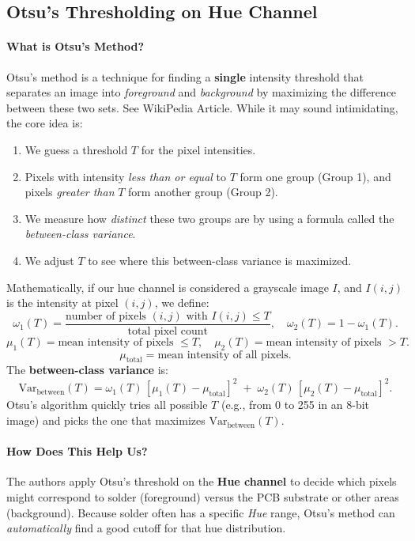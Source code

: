 \documentclass{article}
\begin{document}
\subsection{Otsu’s Thresholding on Hue Channel}
\label{sec:otsu}

\paragraph{What is Otsu’s Method?}
Otsu’s method is a technique for finding a \textbf{single} intensity threshold that separates an image into \emph{foreground} and \emph{background} 
by maximizing the difference between these two sets. See WikiPedia Article.
While it may sound intimidating, the core idea is:

\begin{enumerate}
    \item We guess a threshold $T$ for the pixel intensities.
    \item Pixels with intensity \emph{less than or equal} to $T$ form one group (Group 1), 
          and pixels \emph{greater than} $T$ form another group (Group 2).
    \item We measure how \emph{distinct} these two groups are by using a formula called the \emph{between-class variance}.
    \item We adjust $T$ to see where this between-class variance is maximized.
\end{enumerate}

Mathematically, if our hue channel is considered a grayscale image $I$, and $I(i,j)$ is the intensity at pixel $(i,j)$, 
we define:
\[
  \omega_1(T) = \frac{\text{number of pixels }(i,j)\text{ with }I(i,j) \le T}{\text{total pixel count}},
  \quad
  \omega_2(T) = 1 - \omega_1(T).
\]
\[
  \mu_1(T) = \text{mean intensity of pixels }\le T,
  \quad
  \mu_2(T) = \text{mean intensity of pixels }> T.
\]
\[
  \mu_{\text{total}} = \text{mean intensity of all pixels}.
\]
The \textbf{between-class variance} is:
\[
  \text{Var}_{\text{between}}(T) = 
  \omega_1(T)\,[\mu_1(T) - \mu_{\text{total}}]^2
  \;+\;
  \omega_2(T)\,[\mu_2(T) - \mu_{\text{total}}]^2.
\]
Otsu’s algorithm quickly tries all possible $T$ (e.g., from 0 to 255 in an 8-bit image) and picks the one that maximizes $\text{Var}_{\text{between}}(T)$. 

\paragraph{How Does This Help Us?}
The authors apply Otsu’s threshold on the \textbf{Hue channel} to decide which pixels might correspond to solder (foreground) 
versus the PCB substrate or other areas (background). 
Because solder often has a specific \emph{Hue} range, Otsu’s method can \emph{automatically} find a good cutoff for that hue distribution.
\end{document}
